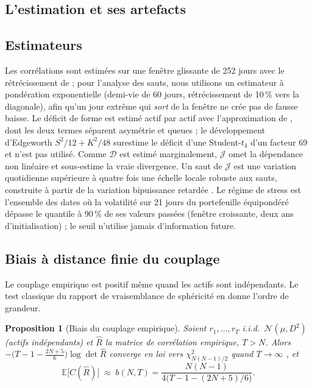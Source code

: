 \documentclass[12pt]{article}
\newtheorem{proposition}{Proposition}
\theoremstyle{definition}
\newcommand{\JJ}{\mathcal{J}}
\newcommand{\DD}{\mathcal{D}}
\newcommand{\E}{\mathbb{E}}
\begin{document}
\begin{doublespace}
\section{L'estimation et ses artefacts}
\label{sec:estimation}

\subsection{Estimateurs}

Les corrélations sont estimées sur une fenêtre glissante de 252 jours avec le
rétrécissement de \citet{ledoit2004} ; pour l'analyse des sauts, nous
utilisons un estimateur à pondération exponentielle (demi-vie de 60 jours,
rétrécissement de 10\,\% vers la diagonale), afin qu'un jour extrême qui
\emph{sort} de la fenêtre ne crée pas de fausse baisse. Le déficit de forme
est estimé actif par actif avec l'approximation de \citet{hyvarinen1998},
dont les deux termes séparent asymétrie et queues ; le développement
d'Edgeworth $S^2/12+K^2/48$ surestime le déficit d'une Student-$t_4$ d'un
facteur 69 et n'est pas utilisé. Comme $\DD$ est estimé marginalement, $\JJ$
omet la dépendance non linéaire et sous-estime la vraie divergence. Un saut de
$\JJ$ est une variation quotidienne supérieure à quatre fois une échelle locale
robuste aux sauts, construite à partir de la variation bipuissance retardée
\citep{bns2004}. Le régime de stress est l'ensemble des dates où la
volatilité sur 21 jours du portefeuille équipondéré dépasse le quantile à
90\,\% de ses valeurs passées (fenêtre croissante, deux ans d'initialisation) ;
le seuil n'utilise jamais d'information future.

\subsection{Biais à distance finie du couplage}

Le couplage empirique est positif même quand les actifs sont indépendants. Le
test classique du rapport de vraisemblance de sphéricité en donne l'ordre de
grandeur.

\begin{proposition}[Biais du couplage empirique]
\label{prop:bias}
Soient $r_1,\dots,r_T$ i.i.d.\ $\mathcal N(\mu,D^2)$ (actifs indépendants) et
$\hat R$ la matrice de corrélation empirique, $T>N$. Alors
$-\bigl(T-1-\tfrac{2N+5}{6}\bigr)\log\det\hat R$ converge en loi vers
$\chi^2_{N(N-1)/2}$ quand $T\to\infty$ \citep{bartlett1950}, et
\begin{equation}
\label{eq:bias}
\E\bigl[C(\hat R)\bigr]\;\approx\;b(N,T)=\frac{N(N-1)}{4\bigl(T-1-(2N+5)/6\bigr)}.
\end{equation}
\end{proposition}


\end{doublespace}
\end{document}
